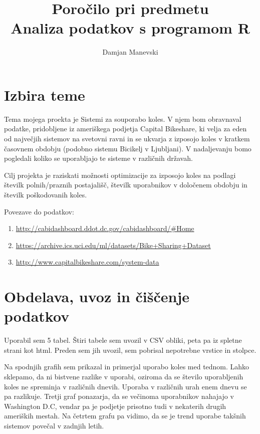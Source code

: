 \documentclass[11pt,a4paper]{article}
\begin{document}
\title{Poročilo pri predmetu \\
Analiza podatkov s programom R}
\author{Damjan Manevski}
\maketitle

\section{Izbira teme}

  Tema mojega proekta je Sistemi za souporabo koles. V njem bom obravnaval podatke, pridobljene iz ameriškega podjetja Capital Bikeshare, ki velja za eden od največjih sistemov na svetovni ravni in se ukvarja z izposojo koles v kratkem časovnem obdobju (podobno sistemu Bicikelj v Ljubljani). V nadaljevanju bomo pogledali koliko se uporabljajo te sisteme v različnih državah. 
  
  Cilj projekta je raziskati možnosti optimizacije za izposojo koles na podlagi številk polnih/praznih postajališč, številk uporabnikov v določenem obdobju in številk poškodovanih koles.
  
  Povezave do podatkov:
  
\begin{enumerate}

\item{\url{http://cabidashboard.ddot.dc.gov/cabidashboard/#Home}}

\item{\url{https://archive.ics.uci.edu/ml/datasets/Bike+Sharing+Dataset}}

\item{\url{http://www.capitalbikeshare.com/system-data}}

\end{enumerate}

\section{Obdelava, uvoz in čiščenje podatkov}

Uporabil sem 5 tabel. Štiri tabele sem uvozil v CSV obliki, peta pa iz spletne strani kot html. Preden sem jih uvozil, sem pobrisal nepotrebne vrstice in stolpce.

Na spodnjih grafih sem prikazal in primerjal uporabo koles med tednom. Lahko sklepamo, da ni bistvene razlike v uporabi, oziroma da se število uporabljenih koles ne spreminja v različnih dnevih. Uporaba v različnih urah enem dnevu se pa razlikuje. Tretji graf ponazarja, da se večinoma uporabnikov nahajajo v Washington D.C, vendar pa je podjetje prisotno tudi v nekaterih drugih ameriških mestah. Na četrtem grafu pa vidimo, da se je trend uporabe takšnih sistemov povečal v zadnjih letih.
\end{document}
